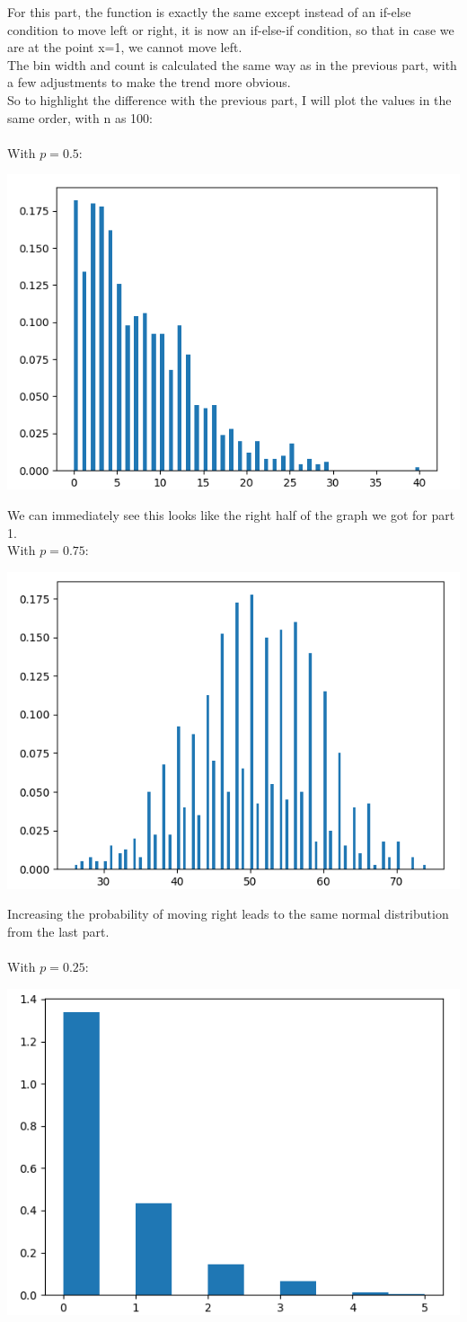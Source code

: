 \documentclass[addpoints]{exam}
\begin{document}
\begin{questions}
For this part, the function is exactly the same except instead of an if-else condition to move left or right, it is now an if-else-if condition, so that in case we are at the point x=1, we cannot move left.\\
The bin width and count is calculated the same way as in the previous part, with a few adjustments to make the trend more obvious.\\
So to highlight the difference with the previous part, I will plot the values in the same order, with n as 100:\\ \\
With $p=0.5$:\\
\begin{center}
\includegraphics[width=.48\textwidth]{images/p1_2_1.png}
\end{center}
We can immediately see this looks like the right half of the graph we got for part 1. \\
With $p=0.75$:\\
\begin{center}
\includegraphics[width=.48\textwidth]{images/p1_2_2.png}
\end{center}
Increasing the probability of moving right leads to the same normal distribution from the last part.\\ \\
With $p=0.25$:\\
\begin{center}
\includegraphics[width=.48\textwidth]{images/p1_2_3.png}

\end{center}
\end{questions}
\end{document}
